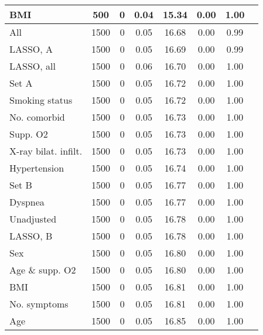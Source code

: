 \documentclass{article}
\begin{document}
{\begin{longtable}{lccccccc}
BMI & 500 & 0 & 0.04 & 15.34 & 0.00 & 1.00\\ \midrule
All & 1500 & 0 & 0.05 & 16.68 & 0.00 & 0.99\\
LASSO, A & 1500 & 0 & 0.05 & 16.69 & 0.00 & 0.99\\
LASSO, all & 1500 & 0 & 0.06 & 16.70 & 0.00 & 1.00\\
Set A & 1500 & 0 & 0.05 & 16.72 & 0.00 & 1.00\\
Smoking status & 1500 & 0 & 0.05 & 16.72 & 0.00 & 1.00\\
No. comorbid & 1500 & 0 & 0.05 & 16.73 & 0.00 & 1.00\\
Supp. O2 & 1500 & 0 & 0.05 & 16.73 & 0.00 & 1.00\\
X-ray bilat. infilt. & 1500 & 0 & 0.05 & 16.73 & 0.00 & 1.00\\
Hypertension & 1500 & 0 & 0.05 & 16.74 & 0.00 & 1.00\\
Set B & 1500 & 0 & 0.05 & 16.77 & 0.00 & 1.00\\
Dyspnea & 1500 & 0 & 0.05 & 16.77 & 0.00 & 1.00\\
Unadjusted & 1500 & 0 & 0.05 & 16.78 & 0.00 & 1.00\\
LASSO, B & 1500 & 0 & 0.05 & 16.78 & 0.00 & 1.00\\
Sex & 1500 & 0 & 0.05 & 16.80 & 0.00 & 1.00\\
Age \& supp. O2 & 1500 & 0 & 0.05 & 16.80 & 0.00 & 1.00\\
BMI & 1500 & 0 & 0.05 & 16.81 & 0.00 & 1.00\\
No. symptoms & 1500 & 0 & 0.05 & 16.81 & 0.00 & 1.00\\
Age & 1500 & 0 & 0.05 & 16.85 & 0.00 & 1.00\\
\bottomrule
\hline
\end{longtable}
}

\clearpage
\end{document}
